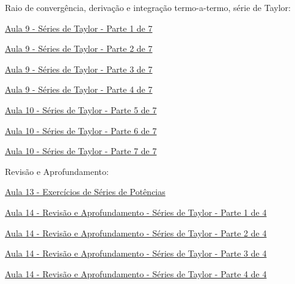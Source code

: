 Raio de convergência,
derivação e integração termo-a-termo,
série de Taylor:
\begin{listlinks}
  \item \href{https://www.youtube.com/watch?v=XNg3c8Pm53U&list=PLxI8Can9yAHeOiMYCBlkyCALloROQ58OY&index=34&t=0s}{Aula 9  - Séries de Taylor - Parte 1 de 7}
  \item \href{https://www.youtube.com/watch?v=g8giCcjyl-8&list=PLxI8Can9yAHeOiMYCBlkyCALloROQ58OY&index=35&t=0s}{Aula 9  - Séries de Taylor - Parte 2 de 7}
  \item \href{https://www.youtube.com/watch?v=4Vd4W0qc68I&list=PLxI8Can9yAHeOiMYCBlkyCALloROQ58OY&index=36&t=0s}{Aula 9  - Séries de Taylor - Parte 3 de 7}
  \item \href{https://www.youtube.com/watch?v=CavnRpUt9bA&list=PLxI8Can9yAHeOiMYCBlkyCALloROQ58OY&index=37&t=0s}{Aula 9  - Séries de Taylor - Parte 4 de 7}
  \item \href{https://www.youtube.com/watch?v=mD0D0c5_9iE&list=PLxI8Can9yAHeOiMYCBlkyCALloROQ58OY&index=38&t=0s}{Aula 10 - Séries de Taylor - Parte 5 de 7}
  \item \href{https://www.youtube.com/watch?v=E72lVIEWkPg&list=PLxI8Can9yAHeOiMYCBlkyCALloROQ58OY&index=39&t=0s}{Aula 10 - Séries de Taylor - Parte 6 de 7}
  \item \href{https://www.youtube.com/watch?v=uTkn4KJPSr0&list=PLxI8Can9yAHeOiMYCBlkyCALloROQ58OY&index=40&t=0s}{Aula 10 - Séries de Taylor - Parte 7 de 7}
\end{listlinks}

Revisão e Aprofundamento:
\begin{listlinks}
  \item \href{https://www.youtube.com/watch?v=MSqsEiOUwWU&list=PLxI8Can9yAHeOiMYCBlkyCALloROQ58OY&index=49&t=0s}{Aula 13 - Exercícios de Séries de Potências}
  \item \href{https://www.youtube.com/watch?v=M3Ve6qPsY9I&list=PLxI8Can9yAHeOiMYCBlkyCALloROQ58OY&index=52&t=0s}{Aula 14 - Revisão e Aprofundamento - Séries de Taylor - Parte 1 de 4}
  \item \href{https://www.youtube.com/watch?v=ldOL7jfU9aI&list=PLxI8Can9yAHeOiMYCBlkyCALloROQ58OY&index=53&t=0s}{Aula 14 - Revisão e Aprofundamento - Séries de Taylor - Parte 2 de 4}
  \item \href{https://www.youtube.com/watch?v=hQfM2tF1VQg&list=PLxI8Can9yAHeOiMYCBlkyCALloROQ58OY&index=50&t=0s}{Aula 14 - Revisão e Aprofundamento - Séries de Taylor - Parte 3 de 4}
  \item \href{https://www.youtube.com/watch?v=sDUW26Yhmf8&list=PLxI8Can9yAHeOiMYCBlkyCALloROQ58OY&index=51&t=0s}{Aula 14 - Revisão e Aprofundamento - Séries de Taylor - Parte 4 de 4}
\end{listlinks}

